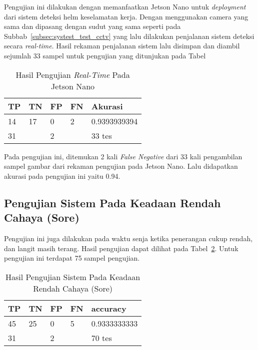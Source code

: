 \par Pengujian ini dilakukan dengan memanfaatkan Jetson Nano untuk \emph{deployment} dari sistem deteksi helm keselamatan kerja. Dengan menggunakan camera yang sama dan dipasang dengan sudut yang sama seperti pada Subbab~\ref{subsec:systest_test_cctv} yang lalu dilakukan penjalanan sistem deteksi secara \emph{real-time}. Hasil rekaman penjalanan sistem lalu disimpan dan diambil sejumlah 33 sampel untuk pengujian yang ditunjukan pada Tabel


\begin{table}
    \centering
    \caption{Hasil Pengujian \emph{Real-Time} Pada Jetson Nano}
    \label{tb:systest_jetson}
    \begin{tabular}{|l|l|l|l|l|} 
        \hline
        TP & TN                    & FP & FN                & Akurasi        \\ 
        \hline
        14 & 17                    & 0  & 2                 & 0.9393939394     \\ 
        \hline
        \multicolumn{2}{|l|}{31}   & \multicolumn{2}{l|}{2} & 33 tes  \\
        \hline
    \end{tabular}
\end{table}

\par Pada pengujian ini, ditemukan 2 kali \emph{False Negative} dari 33 kali pengambilan sampel gambar dari rekaman pengujian pada Jetson Nano. Lalu didapatkan akurasi pada pengujian ini yaitu 0.94. 

\subsection{Pengujian Sistem Pada Keadaan Rendah Cahaya (Sore)}
\label{subsec:systest_test_lowilu_sore}

\par Pengujian ini juga dilakukan pada waktu senja ketika penerangan cukup rendah, dan langit masih terang. Hasil pengujian dapat dilihat pada Tabel~\ref{tb:systest_lowillum_dusk}. Untuk pengujian ini terdapat 75 sampel pengujian.

\begin{table}
    \centering
    \caption{Hasil Pengujian Sistem Pada Keadaan Rendah Cahaya (Sore)}
    \label{tb:systest_lowillum_dusk}
    \begin{tabular}{|l|l|l|l|l|} 
        \hline
        TP & TN                    & FP & FN                & accuracy         \\ 
        \hline
        45 & 25                    & 0  & 5                 & 0.9333333333    \\ 
        \hline
        \multicolumn{2}{|l|}{31}   & \multicolumn{2}{l|}{2} & 70 tes \\
        \hline
    \end{tabular}
\end{table}

